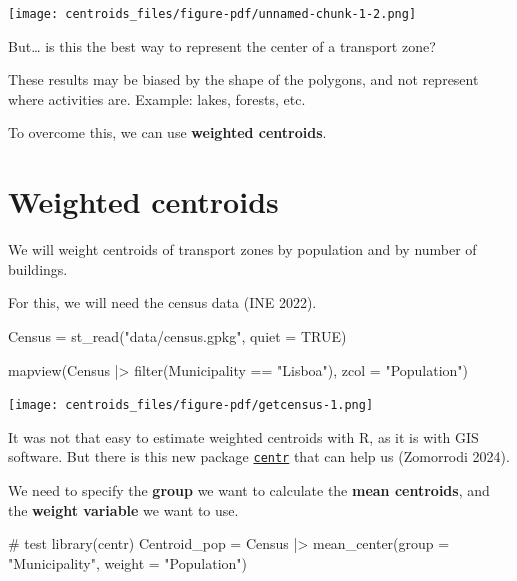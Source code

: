 \documentclass[
  letterpaper,
  DIV=11,
  numbers=noendperiod]{scrreprt}
\newenvironment{Shaded}{\begin{snugshade}}{\end{snugshade}}
\newcommand{\AttributeTok}[1]{\textcolor[rgb]{0.40,0.45,0.13}{#1}}
\newcommand{\CommentTok}[1]{\textcolor[rgb]{0.37,0.37,0.37}{#1}}
\newcommand{\ConstantTok}[1]{\textcolor[rgb]{0.56,0.35,0.01}{#1}}
\newcommand{\FunctionTok}[1]{\textcolor[rgb]{0.28,0.35,0.67}{#1}}
\newcommand{\NormalTok}[1]{\textcolor[rgb]{0.00,0.23,0.31}{#1}}
\newcommand{\OtherTok}[1]{\textcolor[rgb]{0.00,0.23,0.31}{#1}}
\newcommand{\SpecialCharTok}[1]{\textcolor[rgb]{0.37,0.37,0.37}{#1}}
\newcommand{\StringTok}[1]{\textcolor[rgb]{0.13,0.47,0.30}{#1}}
\begin{document}
\texttt{[image: centroids\_files/figure-pdf/unnamed-chunk-1-2.png]}

But\ldots{} is this the best way to represent the center of a transport
zone?

These results may be biased by the shape of the polygons, and not
represent where activities are. Example: lakes, forests, etc.

To overcome this, we can use \textbf{weighted centroids}.

\section{Weighted centroids}\label{weighted-centroids}

We will weight centroids of transport zones by population and by number
of buildings.

For this, we will need the census data (INE 2022).

\begin{Shaded}
\begin{Highlighting}[]
\NormalTok{Census }\OtherTok{=} \FunctionTok{st\_read}\NormalTok{(}\StringTok{"data/census.gpkg"}\NormalTok{, }\AttributeTok{quiet =} \ConstantTok{TRUE}\NormalTok{)}

\FunctionTok{mapview}\NormalTok{(Census }\SpecialCharTok{|\textgreater{}} \FunctionTok{filter}\NormalTok{(Municipality }\SpecialCharTok{==} \StringTok{"Lisboa"}\NormalTok{), }\AttributeTok{zcol =} \StringTok{"Population"}\NormalTok{)}
\end{Highlighting}
\end{Shaded}

\texttt{[image: centroids\_files/figure-pdf/getcensus-1.png]}

It was not that easy to estimate weighted centroids with R, as it is
with GIS software. But there is this new package
\href{https://ryanzomorrodi.github.io/centr}{\texttt{centr}} that can
help us (Zomorrodi 2024).

We need to specify the \textbf{group} we want to calculate the
\textbf{mean centroids}, and the \textbf{weight variable} we want to
use.

\begin{Shaded}
\begin{Highlighting}[]
\CommentTok{\# test}
\FunctionTok{library}\NormalTok{(centr)}
\NormalTok{Centroid\_pop }\OtherTok{=}\NormalTok{ Census }\SpecialCharTok{|\textgreater{}} 
  \FunctionTok{mean\_center}\NormalTok{(}\AttributeTok{group =} \StringTok{"Municipality"}\NormalTok{, }\AttributeTok{weight =} \StringTok{"Population"}\NormalTok{)}
\end{Highlighting}
\end{Shaded}
\end{document}
